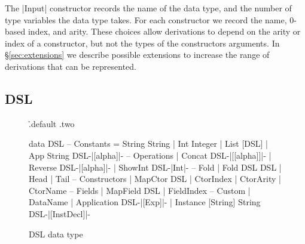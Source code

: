 \documentclass[preprint,draft]{sigplanconf}
\begin{document}
The |Input| constructor records the name of the data type, and the number of type variables the data type takes. For each constructor we record the name, 0-based index, and arity. These choices allow derivations to depend on the arity or index of a constructor, but not the types of the constructors arguments. In \S\ref{sec:extensions} we describe possible extensions to increase the range of derivations that can be represented.

\subsection{DSL}

\begin{figure}
\h{.default .two}\begin{code}
data DSL
       -- Constants
    =  String String
    |  Int Integer
    |  List [DSL]
    |  App String DSL{-|[alpha]|-}
       -- Operations
    |  Concat DSL{-|[[alpha]]|-}
    |  Reverse DSL{-|[alpha]|-}
    |  ShowInt DSL{-|Int|-}
       -- Fold
    |  Fold DSL DSL
    |  Head
    |  Tail
       -- Constructors
    |  MapCtor DSL
    |  CtorIndex
    |  CtorArity
    |  CtorName
       -- Fields
    |  MapField DSL
    |  FieldIndex
       -- Custom
    |  DataName
    |  Application DSL{-|[Exp]|-}
    |  Instance [String] String DSL{-|[InstDecl]|-}
\end{code}
\caption{DSL data type}
\label{fig:dsl}
\end{figure}
\end{document}

